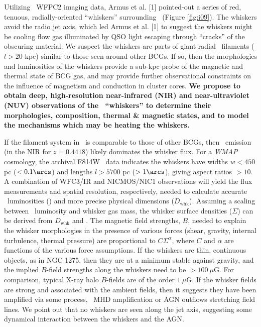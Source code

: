 \documentclass[11pt]{article}
\begin{document}
Utilizing \hst\ WFPC2 imaging data, Armus et al. [1] pointed-out a
series of red, tenuous, radially-oriented ``whiskers'' surrounding
\irs\ (Figure \ref{fig:i09}). The whiskers avoid the radio jet axis,
which led Armus et al. [1] to suggest the whiskers might be cooling
flow gas illuminated by QSO light escaping through ``cracks'' of the
obscuring material. We suspect the whiskers are parts of giant radial
\halpha\ filaments ($l > 20$ kpc) similar to those seen around other
BCGs. If so, then the morphologies and luminosities of the whiskers
provide a sub-kpc probe of the magnetic and thermal state of BCG gas,
and may provide further observational constraints on the influence of
magnetism and conduction in cluster cores. {\bf{We propose to obtain
    deep, high-resolution near-infrared (NIR) and near-ultraviolet
    (NUV) observations of the \iras\ ``whiskers'' to determine their
    morphologies, composition, thermal \& magnetic states, and to
    model the mechanisms which may be heating the whiskers.}}

If the filament system in \irs\ is comparable to those of other BCGs,
then \halpha\ emission (in the NIR for $z=0.4418$) likely dominates
the whisker flux. For a {\it{WMAP}} cosmology, the archival F814W
\hst\ data indicates the whiskers have widths $w < 450$ pc ($<
0.1\arcs$) and lengths $l > 5700$ pc ($> 1\arcs$), giving aspect
ratios $> 10$. A combination of WFC3/IR and NICMOS/NIC1 observations
will yield the flux measurements and spatial resolution, respectively,
needed to calculate accurate \halpha\ luminosities (\lha) and more
precise physical dimensions ($D_{\mathrm{whk}}$). Assuming a scaling
between \halpha\ luminosity and whisker gas mass, the whisker surface
densities ($\Sigma$) can be derived from $D_{\mathrm{whk}}$ and
\lha. The magnetic field strengths, $B$, needed to explain the whisker
morphologies in the presence of various forces (shear, gravity,
internal turbulence, thermal pressure) are proportional to
$C\Sigma^\alpha$, where $C$ and $\alpha$ are functions of the various
force assumptions. If the whiskers are thin, continuous objects, as in
NGC 1275, then they are at a minimum stable against gravity, and the
implied $B$-field strengths along the whiskers need to be $> 100
~\mu$G. For comparison, typical X-ray halo $B$-fields are of the order
$1 ~\mu$G. If the whisker fields are strong and associated with the
ambient fields, then it suggests they have been amplified via some
process, \eg\ MHD amplification or AGN outflows stretching field
lines. We point out that no whiskers are seen along the jet axis,
suggesting some dynamical interaction between the whiskers and the
AGN.
\end{document}
